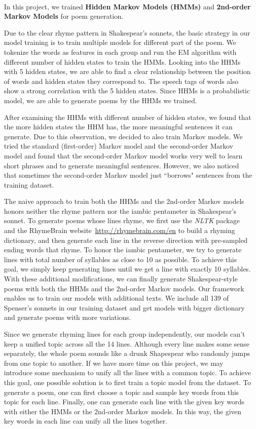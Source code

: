 %
\paragraph{}
In this project, we trained \textbf{Hidden Markov Models (HMMs)} and \textbf{2nd-order Markov Models} for poem generation.

Due to the clear rhyme pattern in Shakespear's sonnets, the basic strategy in our model training is to train multiple models for different part of the poem. We tokenize the words as features in each group and run the EM algorithm with different number of hidden states to train the HMMs. Looking into the HHMs with 5 hidden states, we are able to find a clear relationship between the position of words and hidden states they correspond to. The speech tags of words also show a strong correlation with the 5 hidden states. Since HHMs is a probabilistic model, we are able to generate poems by the HHMs we trained. 

After examining the HHMs with different number of hidden states, we found that the more hidden states the HHM has, the more meaningful sentences it can generate. Due to this observation, we decided to also train Markov models. We tried the standard (first-order) Markov model and the second-order Markov model and found that the second-order Markov model works very well to learn short phrases and to generate meaningful sentences. However, we also noticed that sometimes the second-order Markov model just ``borrows" sentences from the training dataset. 

The naive approach to train both the HHMs and the 2nd-order Markov models honors neither the rhyme pattern nor the iambic pentameter in Shakespear's sonnet. To generate poems whose lines rhyme, we first use the \textit{NLTK} package and the RhymeBrain website~\url{http://rhymebrain.com/en} to build a rhyming dictionary, and then generate each line in the reverse direction with pre-sampled ending words that rhyme. To honor the iambic pentameter, we try to generate lines with total number of syllables as close to 10 as possible. To achieve this goal, we simply keep generating lines until we get a line with exactly 10 syllables. With these additional modifications, we can finally generate Shakespear-style poems with both the HHMs and the 2nd-order Markov models. Our framework enables us to train our models with additional texts. We include all 139 of Spenser's sonnets in our training dataset and get models with bigger dictionary and generate poems with more variations. 

Since we generate rhyming lines for each group independently, our models can't keep a unified topic across all the 14 lines. Although every line makes some sense separately, the whole poem sounds like a drunk Shapespear who randomly jumps from one topic to another. If we have more time on this project, we may introduce some mechanism to unify all the lines with a common topic. To achieve this goal, one possible solution is to first train a topic model from the dataset. To generate a poem, one can first choose a topic and sample key words from this topic for each line. Finally, one can generate each line with the given key words with either the HMMs or the 2nd-order Markov models. In this way, the given key words in each line can unify all the lines together. 